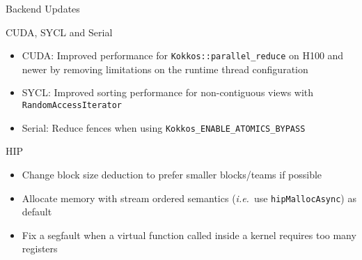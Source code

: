 
\begin{frame}[fragile]

  {\Huge Backend Updates}

  \vspace{10pt}

\end{frame}





\begin{frame}[fragile]{CUDA, SYCL and Serial}
  \begin{itemize}
      \item CUDA: Improved performance for \texttt{Kokkos::parallel\_reduce} on H100 and newer by removing limitations on the runtime thread configuration
      \item SYCL: Improved sorting performance for non-contiguous views with \texttt{RandomAccessIterator}
      \item Serial: Reduce fences when using \texttt{Kokkos\_ENABLE\_ATOMICS\_BYPASS}
  \end{itemize}
\end{frame}

\begin{frame}[fragile]{HIP}
  \begin{itemize}
      \item Change block size deduction to prefer smaller blocks/teams if possible
      \item Allocate memory with stream ordered semantics (\emph{i.e.}\ use \texttt{hipMallocAsync}) as default
      \item Fix a segfault when a virtual function called inside a kernel requires too many registers
  \end{itemize}
\end{frame}




